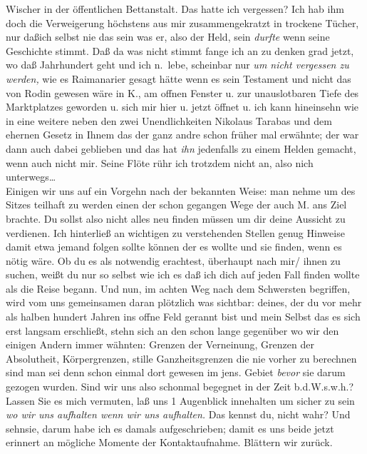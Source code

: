 \documentclass[
]{article}
\begin{document}
Wischer in der öffentlichen Bettanstalt. Das hatte ich vergessen? Ich
hab ihm doch die Verweigerung höchstens aus mir zusammengekratzt in
trockene Tücher, nur daßich selbst nie das sein was er, also der Held,
sein \emph{durfte} wenn seine Geschichte stimmt. Daß da was nicht stimmt
fange ich an zu denken grad jetzt, wo daß Jahrhundert geht und ich
n.~lebe, scheinbar nur \emph{um nicht vergessen zu werden, }wie es
Raimanarier gesagt hätte wenn es sein Testament und nicht das von Rodin
gewesen wäre in K., am offnen Fenster u. zur unauslotbaren Tiefe des
Marktplatzes geworden u. sich mir hier u. jetzt öffnet u. ich kann
hineinsehn wie in eine weitere neben den zwei Unendlichkeiten Nikolaus
Tarabas\textquotesingle{} und dem ehernen Gesetz in Ihnem das der ganz
andre schon früher mal erwähnte; der war dann auch dabei geblieben und
das hat \emph{ihn} jedenfalls zu einem Helden gemacht, wenn auch nicht
mir. Seine Flöte rühr ich trotzdem nicht an, also nich
unterwegs\ldots{}\\
Einigen wir uns auf ein Vorgehn nach der bekannten Weise: man nehme um
des Sitzes teilhaft zu werden einen der schon gegangen Wege der auch M.
ans Ziel brachte. Du sollst also nicht alles neu finden müssen um dir
deine Aussicht zu verdienen. Ich hinterließ an wichtigen zu verstehenden
Stellen genug Hinweise damit etwa jemand folgen sollte können der es
wollte und sie finden, wenn es nötig wäre. Ob du es als notwendig
erachtest, überhaupt nach mir/ ihnen zu suchen, weißt du nur so selbst
wie ich es daß ich dich auf jeden Fall finden wollte als die Reise
begann. Und nun, im achten Weg nach dem Schwersten begriffen, wird vom
uns gemeinsamen daran plötzlich was sichtbar: deines, der du vor mehr
als halben hundert Jahren ins offne Feld gerannt bist und mein Selbst
das es sich erst langsam erschließt, stehn sich an den schon lange
gegenüber wo wir den einigen Andern immer wähnten: Grenzen der
Verneinung, Grenzen der Absolutheit, Körpergrenzen, stille
Ganzheitsgrenzen die nie vorher zu berechnen sind man sei denn schon
einmal dort gewesen im jens. Gebiet \emph{bevor} sie darum gezogen
wurden. Sind wir uns also schonmal begegnet in der Zeit b.d.W.s.w.h.?
Lassen Sie es mich vermuten, laß uns 1 Augenblick innehalten um sicher
zu sein \emph{wo wir uns aufhalten wenn wir uns aufhalten.} Das kennst
du, nicht wahr? Und sehnsie, darum habe ich es damals aufgeschrieben;
damit es uns beide jetzt erinnert an mögliche Momente der
Kontaktaufnahme. Blättern wir zurück.
\end{document}
